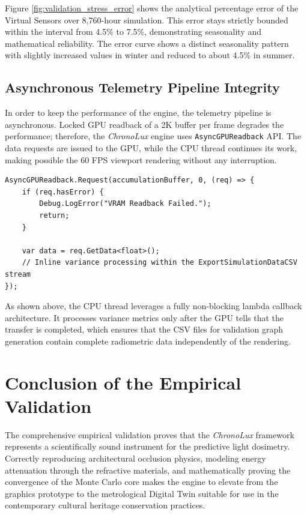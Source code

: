 Figure \ref{fig:validation_stress_error} shows the analytical percentage error of the Virtual Sensors over 8,760-hour simulation. This error stays strictly bounded within the interval from 4.5\% to 7.5\%, demonstrating seasonality and mathematical reliability. The error curve shows a distinct seasonality pattern with slightly increased values in winter and reduced to about 4.5\% in summer.

\subsection{Asynchronous Telemetry Pipeline Integrity}

In order to keep the performance of the engine, the telemetry pipeline is asynchronous. Locked GPU readback of a 2K buffer per frame degrades the performance; therefore, the \textit{ChronoLux} engine uses \texttt{AsyncGPUReadback} API. The data requests are issued to the GPU, while the CPU thread continues its work, making possible the 60 FPS viewport rendering without any interruption.

\begin{lstlisting}[language={[Sharp]C}, caption={Asynchronous background callback in \texttt{LightDoseSimulator.cs} ensuring non-blocking data extraction.}, label={lst:async_readback}]
AsyncGPUReadback.Request(accumulationBuffer, 0, (req) => {
    if (req.hasError) {
        Debug.LogError("VRAM Readback Failed.");
        return;
    }

    var data = req.GetData<float>();
    // Inline variance processing within the ExportSimulationDataCSV stream
});
\end{lstlisting}

As shown above, the CPU thread leverages a fully non-blocking lambda callback architecture. It processes variance metrics only after the GPU tells that the transfer is completed, which ensures that the CSV files for validation graph generation contain complete radiometric data independently of the rendering.

\section{Conclusion of the Empirical Validation}

The comprehensive empirical validation proves that the \textit{ChronoLux} framework represents a scientifically sound instrument for the predictive light dosimetry. Correctly reproducing architectural occlusion physics, modeling energy attenuation through the refractive materials, and mathematically proving the convergence of the Monte Carlo core makes the engine to elevate from the graphics prototype to the metrological Digital Twin suitable for use in the contemporary cultural heritage conservation practices.
